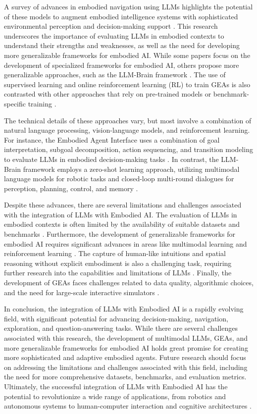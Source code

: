 \documentclass[conference]{IEEEtran}
\begin{document}
A survey of advances in embodied navigation using LLMs highlights the potential of these models to augment embodied intelligence systems with sophisticated environmental perception and decision-making support \cite{b5}. This research underscores the importance of evaluating LLMs in embodied contexts to understand their strengths and weaknesses, as well as the need for developing more generalizable frameworks for embodied AI. While some papers focus on the development of specialized frameworks for embodied AI, others propose more generalizable approaches, such as the LLM-Brain framework \cite{b2}. The use of supervised learning and online reinforcement learning (RL) to train GEAs is also contrasted with other approaches that rely on pre-trained models or benchmark-specific training \cite{b4}.

The technical details of these approaches vary, but most involve a combination of natural language processing, vision-language models, and reinforcement learning. For instance, the Embodied Agent Interface uses a combination of goal interpretation, subgoal decomposition, action sequencing, and transition modeling to evaluate LLMs in embodied decision-making tasks \cite{b1}. In contrast, the LLM-Brain framework employs a zero-shot learning approach, utilizing multimodal language models for robotic tasks and closed-loop multi-round dialogues for perception, planning, control, and memory \cite{b2}.

Despite these advances, there are several limitations and challenges associated with the integration of LLMs with Embodied AI. The evaluation of LLMs in embodied contexts is often limited by the availability of suitable datasets and benchmarks \cite{b1}. Furthermore, the development of generalizable frameworks for embodied AI requires significant advances in areas like multimodal learning and reinforcement learning \cite{b2}. The capture of human-like intuitions and spatial reasoning without explicit embodiment is also a challenging task, requiring further research into the capabilities and limitations of LLMs \cite{b3}. Finally, the development of GEAs faces challenges related to data quality, algorithmic choices, and the need for large-scale interactive simulators \cite{b4}.

In conclusion, the integration of LLMs with Embodied AI is a rapidly evolving field, with significant potential for advancing decision-making, navigation, exploration, and question-answering tasks. While there are several challenges associated with this research, the development of multimodal LLMs, GEAs, and more generalizable frameworks for embodied AI holds great promise for creating more sophisticated and adaptive embodied agents. Future research should focus on addressing the limitations and challenges associated with this field, including the need for more comprehensive datasets, benchmarks, and evaluation metrics. Ultimately, the successful integration of LLMs with Embodied AI has the potential to revolutionize a wide range of applications, from robotics and autonomous systems to human-computer interaction and cognitive architectures \cite{b5}.
\end{document}
